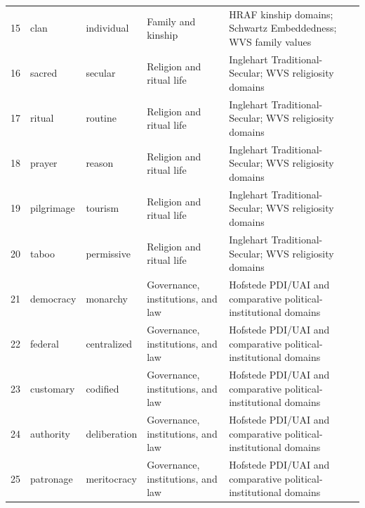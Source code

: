 \begin{tabular}{@{}rlllll@{}}
15 & clan & individual & Family and kinship & HRAF kinship domains; Schwartz Embeddedness; WVS family values & \cite{schwartz2006theory} \\
16 & sacred & secular & Religion and ritual life & Inglehart Traditional-Secular; WVS religiosity domains & \cite{inglehart2005modernization} \\
17 & ritual & routine & Religion and ritual life & Inglehart Traditional-Secular; WVS religiosity domains & \cite{house2004culture} \\
18 & prayer & reason & Religion and ritual life & Inglehart Traditional-Secular; WVS religiosity domains & \cite{inglehart2005modernization} \\
19 & pilgrimage & tourism & Religion and ritual life & Inglehart Traditional-Secular; WVS religiosity domains & \cite{hershcovich2022challenges} \\
20 & taboo & permissive & Religion and ritual life & Inglehart Traditional-Secular; WVS religiosity domains & \cite{hofstede2001culture} \\
21 & democracy & monarchy & Governance, institutions, and law & Hofstede PDI/UAI and comparative political-institutional domains & \cite{hofstede2001culture} \\
22 & federal & centralized & Governance, institutions, and law & Hofstede PDI/UAI and comparative political-institutional domains & \cite{house2004culture} \\
23 & customary & codified & Governance, institutions, and law & Hofstede PDI/UAI and comparative political-institutional domains & \cite{hofstede2001culture} \\
24 & authority & deliberation & Governance, institutions, and law & Hofstede PDI/UAI and comparative political-institutional domains & \cite{house2004culture} \\
25 & patronage & meritocracy & Governance, institutions, and law & Hofstede PDI/UAI and comparative political-institutional domains & \cite{hofstede2001culture} \\
\bottomrule
\end{tabular}

